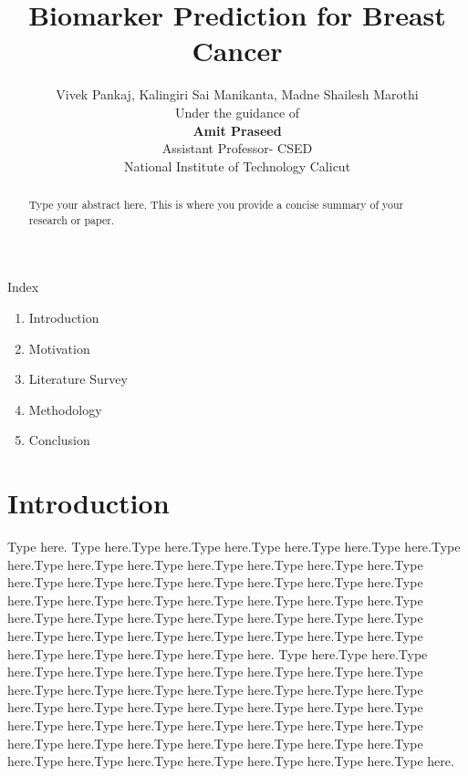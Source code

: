 \documentclass[10pt,a4paper,twocolumn]{article}
\title{\textbf{\huge Biomarker Prediction for Breast Cancer}}
\author{Vivek Pankaj, Kalingiri Sai Manikanta, Madne Shailesh Marothi\\Under the guidance of
	\\\textbf{Amit Praseed} \\ Assistant Professor- CSED \\National Institute of Technology Calicut}
\date{}
\renewcommand\thesection{\Roman{section}}
\begin{document}
	\maketitle
	
	
	\begin{abstract}
		Type your abstract here. This is where you provide a concise summary of your research or paper.
	\end{abstract}
	
	{\large Index}
	
	\begin{enumerate}
		\item Introduction
		\item Motivation
		\item Literature Survey
		\item Methodology
		\item Conclusion
	\end{enumerate}
	
	\section{Introduction}
	\par
	Type here. Type here.Type here.Type here.Type here.Type here.Type here.Type here.Type here.Type here.Type here.Type here.Type here.Type here.Type here.Type here.Type here.Type here.Type here.Type here.Type here.Type here.Type here.Type here.Type here.Type here.Type here.Type here.Type here.Type here.Type here.Type here.Type here.Type here.Type here.Type here.Type here.Type here.Type here.Type here.Type here.Type here.Type here.Type here.Type here.Type here.Type here. Type here.Type here.Type here.Type here.Type here.Type here.Type here.Type here.Type here.Type here.Type here.Type here.Type here.Type here.Type here.Type here.Type here.Type here.Type here.Type here.Type here.Type here.Type here.Type here.Type here.Type here.Type here.Type here.Type here.Type here.Type here.Type here.Type here.Type here.Type here.Type here.Type here.Type here.Type here.Type here.Type here.Type here.Type here.Type here.Type here.
	
\end{document}
